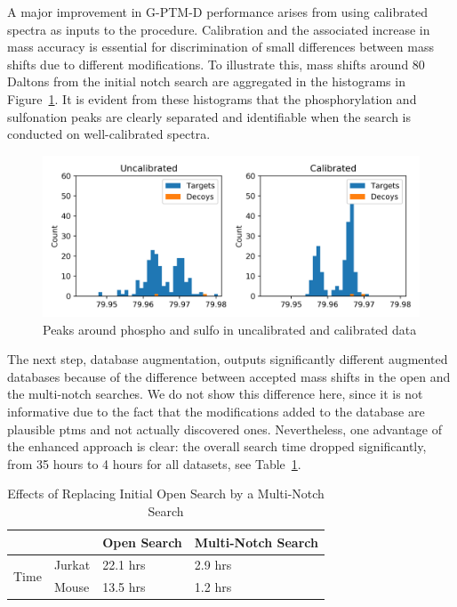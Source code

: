 \documentclass[journal=jprobs,manuscript=article]{achemso}
\begin{document}
A major improvement in G-PTM-D performance arises from using calibrated spectra as inputs to the procedure.
Calibration and the associated increase in mass accuracy is essential for discrimination of small differences between mass shifts due to different modifications.
To illustrate this, mass shifts around 80 Daltons from the initial notch search are aggregated in the histograms in Figure~\ref{fig:fig7-ZeroAndPhospho}.
It is evident from these histograms that the phosphorylation and sulfonation peaks are clearly separated and identifiable when the search is conducted on well-calibrated spectra.


\begin{figure}[H]
\includegraphics{fig7-ZeroAndPhospho.png}
\caption{Peaks around phospho and sulfo in uncalibrated and calibrated data}
\label{fig:fig7-ZeroAndPhospho}
\end{figure}

The next step, database augmentation, outputs significantly different augmented databases because of the difference between accepted mass shifts in the open and the multi-notch searches.
We do not show this difference here, since it is not informative due to the fact that the modifications added to the database are plausible ptms and not actually discovered ones.
Nevertheless, one advantage of the enhanced approach is clear: the overall search time dropped significantly, from 35 hours to 4 hours for all datasets, see Table~\ref{my-labelff}.

\begin{table}[]
\centering
\caption{Effects of Replacing Initial Open Search by a Multi-Notch Search}
\label{my-labelff}
\begin{tabular}{ll|l|l}
                      &        & Open Search & Multi-Notch Search\\
\hline
\multirow{2}{*}{Time} & Jurkat & 22.1 hrs         & 2.9 hrs    \\
                      & Mouse  & 13.5 hrs         & 1.2 hrs   \\
\end{tabular}
\end{table}
\end{document}
